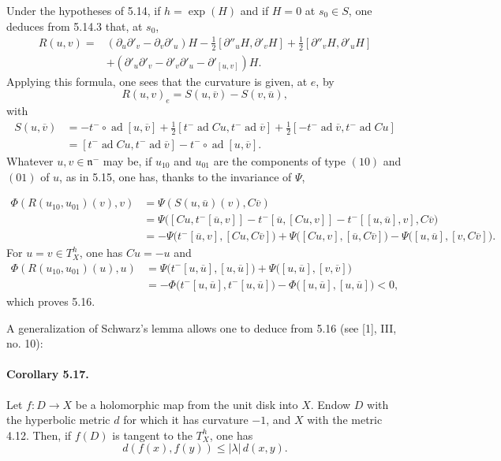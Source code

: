 \documentclass[10pt]{article}
\theoremstyle{deligne}
\newcommand{\ad}{\operatorname{ad}}
\begin{document}
Under the hypotheses of 5.14, if $h=\exp(H)$ and if $H=0$ at $s_0\in S$, one deduces from 5.14.3 that, at $s_0$,
\[
\begin{aligned}
R(u,v)
={}&(\partial_u\partial'_v-\partial_v\partial'_u)H
-\tfrac12[\partial''_uH,\partial'_vH]
+\tfrac12[\partial''_vH,\partial'_uH]\\
&+(\partial'_u\partial'_v-\partial'_v\partial'_u-\partial'_{[u,v]})H .
\end{aligned}
\]
Applying this formula, one sees that the curvature is given, at $e$, by
\[
  R(u,v)_e=S(u,\overline v)-S(v,\overline u),
\]
with
\[
\begin{aligned}
S(u,\overline v)
&=-t^-\circ\ad[u,\overline v]
+\tfrac12[t^-\ad Cu,t^-\ad\overline v]
+\tfrac12[-t^-\ad\overline v,t^-\ad Cu]\\
&=[t^-\ad Cu,t^-\ad\overline v]
-t^-\circ\ad[u,\overline v].
\end{aligned}
\]
Whatever $u,v\in\mathfrak n^-$ may be, if $u_{10}$ and $u_{01}$ are the components of type $(10)$ and $(01)$ of $u$, as in 5.15, one has, thanks to the invariance of $\Psi$,


\[
\begin{aligned}
\Phi(R(u_{10},u_{01})(v),v)
&=\Psi(S(u,\overline u)(v),C\overline v)\\
&=\Psi\bigl([Cu,t^-[\overline u,v]]-t^-[\overline u,[Cu,v]]-t^-[[u,\overline u],v],C\overline v\bigr)\\
&=-\Psi\bigl(t^-[\overline u,v],[Cu,C\overline v]\bigr)
  +\Psi\bigl([Cu,v],[\overline u,C\overline v]\bigr)
  -\Psi\bigl([u,\overline u],[v,C\overline v]\bigr).
\end{aligned}
\]
For $u=v\in T_X^h$, one has $Cu=-u$ and
\[
\begin{aligned}
\Phi(R(u_{10},u_{01})(u),u)
&=\Psi\bigl(t^-[u,\overline u],[u,\overline u]\bigr)
  +\Psi\bigl([u,\overline u],[v,\overline v]\bigr)\\
&=-\Phi\bigl(t^-[u,\overline u],t^-[u,\overline u]\bigr)
  -\Phi\bigl([u,\overline u],[u,\overline u]\bigr)<0,
\end{aligned}
\]
which proves 5.16.

A generalization of Schwarz's lemma allows one to deduce from 5.16 (see [1], III, no. 10):

\paragraph{Corollary 5.17.}
Let $f:D\to X$ be a holomorphic map from the unit disk into $X$. Endow $D$ with the hyperbolic metric $d$ for which it has curvature $-1$, and $X$ with the metric 4.12. Then, if $f(D)$ is tangent to the $T_X^h$, one has
\[
  d(f(x),f(y))\le |\lambda|\,d(x,y).
\]
\end{document}
